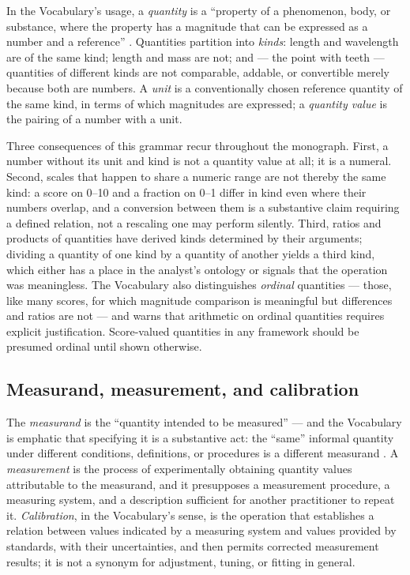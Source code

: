 In the Vocabulary's usage, a \emph{quantity} is a ``property of a phenomenon, body, or substance, where the property has a magnitude that can be expressed as a number and a reference'' \cite{vim}. Quantities partition into \emph{kinds}: length and wavelength are of the same kind; length and mass are not; and --- the point with teeth --- quantities of different kinds are not comparable, addable, or convertible merely because both are numbers. A \emph{unit} is a conventionally chosen reference quantity of the same kind, in terms of which magnitudes are expressed; a \emph{quantity value} is the pairing of a number with a unit.

Three consequences of this grammar recur throughout the monograph. First, a number without its unit and kind is not a quantity value at all; it is a numeral. Second, scales that happen to share a numeric range are not thereby the same kind: a score on 0--10 and a fraction on 0--1 differ in kind even where their numbers overlap, and a conversion between them is a substantive claim requiring a defined relation, not a rescaling one may perform silently. Third, ratios and products of quantities have derived kinds determined by their arguments; dividing a quantity of one kind by a quantity of another yields a third kind, which either has a place in the analyst's ontology or signals that the operation was meaningless. The Vocabulary also distinguishes \emph{ordinal} quantities --- those, like many scores, for which magnitude comparison is meaningful but differences and ratios are not --- and warns that arithmetic on ordinal quantities requires explicit justification. Score-valued quantities in any framework should be presumed ordinal until shown otherwise.

\subsection{Measurand, measurement, and calibration}\label{ch02:metrology:measurand}

The \emph{measurand} is the ``quantity intended to be measured'' --- and the Vocabulary is emphatic that specifying it is a substantive act: the ``same'' informal quantity under different conditions, definitions, or procedures is a different measurand \cite{vim}. A \emph{measurement} is the process of experimentally obtaining quantity values attributable to the measurand, and it presupposes a measurement procedure, a measuring system, and a description sufficient for another practitioner to repeat it. \emph{Calibration}, in the Vocabulary's sense, is the operation that establishes a relation between values indicated by a measuring system and values provided by standards, with their uncertainties, and then permits corrected measurement results; it is not a synonym for adjustment, tuning, or fitting in general.

